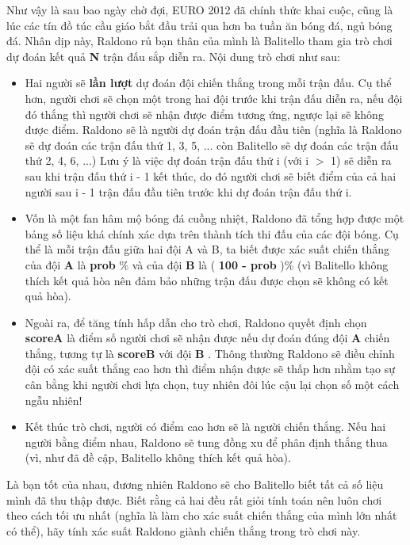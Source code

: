 Như vậy là sau bao ngày chờ đợi, EURO 2012 đã chính thức khai cuộc, cũng là lúc các tín đồ túc cầu giáo bắt đầu trải qua hơn ba tuần ăn bóng đá, ngủ bóng đá. Nhân dịp này, Raldono rủ bạn thân của mình là Balitello tham gia trò chơi dự đoán kết quả \textbf{ N } trận đấu sắp diễn ra. Nội dung trò chơi như sau:
\begin{itemize}
	\item Hai người sẽ \textbf{ lần lượt } dự đoán đội chiến thắng trong mỗi trận đấu. Cụ thể hơn, người chơi sẽ chọn một trong hai đội trước khi trận đấu diễn ra, nếu đội đó thắng thì người chơi sẽ nhận được điểm tương ứng, ngược lại sẽ không được điểm. Raldono sẽ là người dự đoán trận đấu đầu tiên (nghĩa là Raldono sẽ dự đoán các trận đấu thứ 1, 3, 5, ... còn Balitello sẽ dự đoán các trận đấu thứ 2, 4, 6, ...) Lưu ý là việc dự đoán trận đấu thứ i (với i $>$ 1) sẽ diễn ra sau khi trận đấu thứ i - 1 kết thúc, do đó người chơi sẽ biết điểm của cả hai người sau i - 1 trận đấu đầu tiên trước khi dự đoán trận đấu thứ i.
\end{itemize}
\begin{itemize}
	\item Vốn là một fan hâm mộ bóng đá cuồng nhiệt, Raldono đã tổng hợp được một bảng số liệu khá chính xác dựa trên thành tích thi đấu của các đội bóng. Cụ thể là mỗi trận đấu giữa hai đội A và B, ta biết được xác suất chiến thắng của đội \textbf{ A } là \textbf{ prob } \% và của đội \textbf{ B } là ( \textbf{ 100 - prob } )\% (vì Balitello không thích kết quả hòa nên đảm bảo những trận đấu được chọn sẽ không có kết quả hòa).
\end{itemize}
\begin{itemize}
	\item Ngoài ra, để tăng tính hấp dẫn cho trò chơi, Raldono quyết định chọn \textbf{ scoreA } là điểm số người chơi sẽ nhận được nếu dự đoán đúng đội \textbf{ A } chiến thắng, tương tự là \textbf{ scoreB } với đội \textbf{ B } . Thông thường Raldono sẽ điều chỉnh đội có xác suất thắng cao hơn thì điểm nhận được sẽ thấp hơn nhằm tạo sự cân bằng khi người chơi lựa chọn, tuy nhiên đôi lúc cậu lại chọn số một cách ngẫu nhiên!
\end{itemize}
\begin{itemize}
	\item Kết thúc trò chơi, người có điểm cao hơn sẽ là người chiến thắng. Nếu hai người bằng điểm nhau, Raldono sẽ tung đồng xu để phân định thắng thua (vì, như đã đề cập, Balitello không thích kết quả hòa).
\end{itemize}
\begin{itemize}
\end{itemize}

Là bạn tốt của nhau, đương nhiên Raldono sẽ cho Balitello biết tất cả số liệu mình đã thu thập được. Biết rằng cả hai đều rất giỏi tính toán nên luôn chơi theo cách tối ưu nhất (nghĩa là làm cho xác suất chiến thắng của mình lớn nhất có thể), hãy tính xác suất Raldono giành chiến thắng trong trò chơi này.